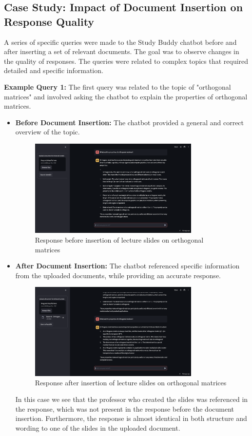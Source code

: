 \subsection{Case Study: Impact of Document Insertion on Response Quality}
A series of specific queries were made to the Study Buddy chatbot before and after inserting a set of relevant documents. The goal was to observe changes in the quality of responses. The queries were related to complex topics that required detailed and specific information.

\textbf{Example Query 1:}
The first query was related to the topic of "orthogonal matrices" and involved asking the chatbot to explain the properties of orthogonal matrices.
\begin{itemize}
    \item \textbf{Before Document Insertion:} The chatbot provided a general and correct overview of the topic.
    \begin{figure}[H]
        \centering
        \includegraphics[width=0.8\textwidth]{figs/BeforeOrthogonal.png}
        \caption{Response before insertion of lecture slides on orthogonal matrices}
        \label{fig:before_orthogonal_matrices}
    \end{figure}
    \item \textbf{After Document Insertion:} The chatbot referenced specific information from the uploaded documents, while providing an accurate response.
    \begin{figure}[H]
        \centering
        \includegraphics[width=0.8\textwidth]{figs/AfterOrthogonal.png}
        \caption{Response after insertion of lecture slides on orthogonal matrices}
        \label{fig:after_orthogonal_matrices}
    \end{figure}
    In this case we see that the professor who created the slides was referenced in the response, which was not present in the response before the document insertion. Furthermore, the response is almost identical in both structure and wording to one of the slides in the uploaded document.
\end{itemize}

